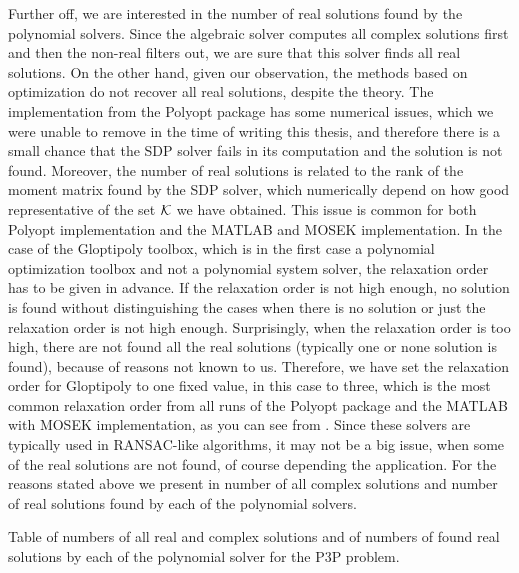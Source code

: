 Further off, we are interested in the number of real solutions found by the polynomial solvers.
Since the algebraic solver computes all complex solutions first and then the non-real filters out, we are sure that this solver finds all real solutions.
On the other hand, given our observation, the methods based on optimization do not recover all real solutions, despite the theory.
The implementation from the Polyopt package has some numerical issues, which we were unable to remove in the time of writing this thesis, and therefore there is a small chance that the SDP solver fails in its computation and the solution is not found.
Moreover, the number of real solutions is related to the rank of the moment matrix found by the SDP solver, which  numerically depend on how good representative of the set $\mathcal{K}$ we have obtained.
This issue is common for both Polyopt implementation and the MATLAB and MOSEK implementation.
In the case of the Gloptipoly toolbox, which is in the first case a polynomial optimization toolbox and not a polynomial system solver, the relaxation order has to be given in advance.
If the relaxation order is not high enough, no solution is found without distinguishing the cases when there is no solution or just the relaxation order is not high enough.
Surprisingly, when the relaxation order is too high, there are not found all the real solutions (typically one or none solution is found), because of reasons not known to us.
Therefore, we have set the relaxation order for Gloptipoly to one fixed value, in this case to three, which is the most common relaxation order from all runs of the Polyopt package and the MATLAB with MOSEK implementation, as you can see from .
Since these solvers are typically used in RANSAC-like \cite{ransac} algorithms, it may not be a big issue, when some of the real solutions are not found, of course depending the application.
For the reasons stated above we present in  number of all complex solutions and number of real solutions found by each of the polynomial solvers.

\begin{table}[ht]
  \centering
  
  \caption{Table of numbers of all real and complex solutions and of numbers of found real solutions by each of the polynomial solver for the P3P problem.}
\end{table}

